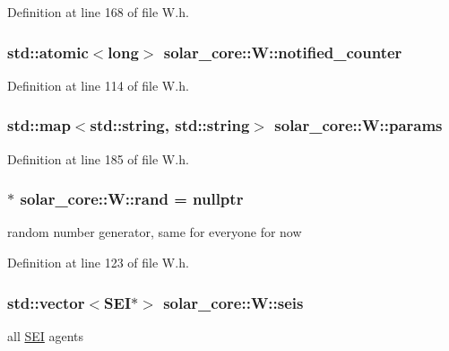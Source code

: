 Definition at line 168 of file W.\+h.

\hypertarget{classsolar__core_1_1_w_afee32d515534826a60ddf12936f85a3d}{}
\subsubsection[{notified\+\_\+counter}]{\setlength{\rightskip}{0pt plus 5cm}std\+::atomic$<$long$>$ solar\+\_\+core\+::\+W\+::notified\+\_\+counter}\label{classsolar__core_1_1_w_afee32d515534826a60ddf12936f85a3d}


Definition at line 114 of file W.\+h.

\hypertarget{classsolar__core_1_1_w_a0d06bc7242f8b3958986118eb217583f}{}
\subsubsection[{params}]{\setlength{\rightskip}{0pt plus 5cm}std\+::map$<$std\+::string, std\+::string$>$ solar\+\_\+core\+::\+W\+::params\hspace{0.3cm}{\ttfamily [protected]}}\label{classsolar__core_1_1_w_a0d06bc7242f8b3958986118eb217583f}


Definition at line 185 of file W.\+h.

\hypertarget{classsolar__core_1_1_w_aa60afb55012cd72e304ac2c133e5a245}{}
\subsubsection[{rand}]{$\ast$ solar\+\_\+core\+::\+W\+::rand = nullptr}\label{classsolar__core_1_1_w_aa60afb55012cd72e304ac2c133e5a245}
random number generator, same for everyone for now 

Definition at line 123 of file W.\+h.

\hypertarget{classsolar__core_1_1_w_a311baa30390494ae8e79f26e372e716d}{}
\subsubsection[{seis}]{\setlength{\rightskip}{0pt plus 5cm}std\+::vector$<${\bf S\+E\+I}$\ast$$>$ solar\+\_\+core\+::\+W\+::seis\hspace{0.3cm}{\ttfamily [protected]}}\label{classsolar__core_1_1_w_a311baa30390494ae8e79f26e372e716d}
all \hyperlink{classsolar__core_1_1_s_e_i}{S\+E\+I} agents 


